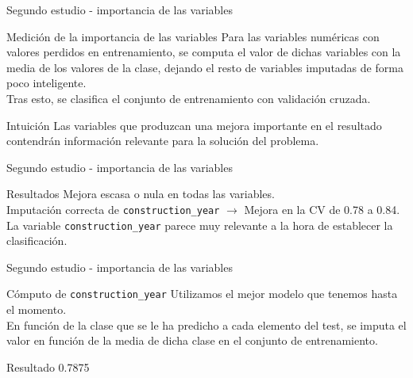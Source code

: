 \begin{frame}{Segundo estudio - importancia de las variables}
  \begin{block}{Medición de la importancia de las variables}
    Para las variables numéricas con valores perdidos en
    entrenamiento, se computa el valor de dichas variables con la
    media de los valores de la clase, dejando el resto de variables
    imputadas de forma poco inteligente.\\

    Tras esto, se clasifica el conjunto de entrenamiento con
    validación cruzada.
  \end{block}
  \begin{block}{Intuición}
    Las variables que produzcan una mejora importante en el resultado
    contendrán información relevante para la solución del problema.
  \end{block}
\end{frame}

\begin{frame}{Segundo estudio - importancia de las variables}
  \begin{block}{Resultados}
    Mejora escasa o nula en todas las variables.\\

    Imputación correcta de \texttt{construction\_year} $\rightarrow$
    Mejora en la CV de 0.78 a 0.84.\\

    La variable \texttt{construction\_year} parece muy relevante a
    la hora de establecer la clasificación.
  \end{block}
\end{frame}

\begin{frame}{Segundo estudio - importancia de las variables}
  \begin{block}{Cómputo de \texttt{construction\_year}}
    Utilizamos el mejor modelo que tenemos hasta el momento.\\

    En función de la clase que se le ha predicho a cada elemento del
    test, se imputa el valor en función de la media de dicha clase
    en el conjunto de entrenamiento.
  \end{block}
  \begin{block}{Resultado}
    0.7875
  \end{block}
\end{frame}

